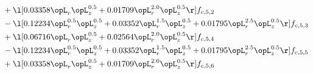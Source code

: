 \begin{alignat}{2}
& + \l[  0.03358 \opL_r \opL_z^{0.5} +  0.01709 \opL_r^{2.0} \opL_z^{0.5}  \r] f_{c,5,2} \nonumber \\ 
& - \l[  0.12234 \opL_r^{0.5} \opL_z^{0.5} +  0.03352 \opL_r^{1.5} \opL_z^{0.5} +  0.01795 \opL_r^{2.5} \opL_z^{0.5}  \r] f_{c,5,3} \nonumber \\ 
& + \l[  0.06716 \opL_r \opL_z^{0.5} +  0.02564 \opL_r^{2.0} \opL_z^{0.5}  \r] f_{c,5,4} \nonumber \\ 
& - \l[  0.12234 \opL_r^{0.5} \opL_z^{0.5} +  0.03352 \opL_r^{1.5} \opL_z^{0.5} +  0.01795 \opL_r^{2.5} \opL_z^{0.5}  \r] f_{c,5,5} \nonumber \\ 
& + \l[  0.03358 \opL_r \opL_z^{0.5} +  0.01709 \opL_r^{2.0} \opL_z^{0.5}  \r] f_{c,5,6} \nonumber \\ 
\end{alignat} 


